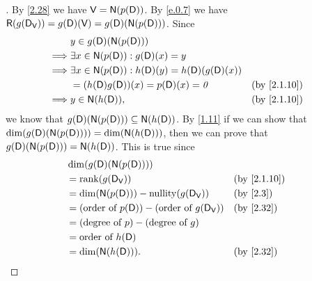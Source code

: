 \begin{proof}[]
  By \cref{2.28} we have \(\V = \ns{p(\Dop)}\).
  By \cref{e.0.7} we have \(\rg{g(\Dop_{\V})} = g(\Dop)(\V) = g(\Dop)(\ns{p(\Dop)})\).
  Since
  \begin{align*}
             & y \in g(\Dop)(\ns{p(\Dop)})                                                                  \\
    \implies & \exists x \in \ns{p(\Dop)} : g(\Dop)(x) = y                                                  \\
    \implies & \exists x \in \ns{p(\Dop)} : h(\Dop)(y) = h(\Dop)(g(\Dop)(x))                                \\
             & = (h(\Dop) g(\Dop))(x) = p(\Dop)(x) = \zv                     &  & \text{(by \cref{2.1.10})} \\
    \implies & y \in \ns{h(\Dop)},                                           &  & \text{(by \cref{2.1.10})}
  \end{align*}
  we know that \(g(\Dop)(\ns{p(\Dop)}) \subseteq \ns{h(\Dop)}\).
  By \cref{1.11} if we can show that \(\dim(g(\Dop)(\ns{p(\Dop)})) = \dim(\ns{h(\Dop)})\), then we can prove that \(g(\Dop)(\ns{p(\Dop)}) = \ns{h(\Dop)}\).
  This is true since
  \begin{align*}
     & \dim(g(\Dop)(\ns{p(\Dop)}))                                                                   \\
     & = \rk{g(\Dop_{\V})}                                            &  & \text{(by \cref{2.1.10})} \\
     & = \dim(\ns{p(\Dop)}) - \nt{g(\Dop_{\V})}                       &  & \text{(by \cref{2.3})}    \\
     & = (\text{order of } p(\Dop)) - (\text{order of } g(\Dop_{\V})) &  & \text{(by \cref{2.32})}   \\
     & = (\text{degree of } p) - (\text{degree of } g)                                               \\
     & = \text{order of } h(\Dop)                                                                    \\
     & = \dim(\ns{h(\Dop)}).                                          &  & \text{(by \cref{2.32})}
  \end{align*}
\end{proof}
